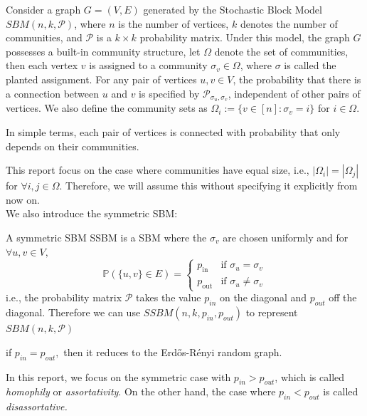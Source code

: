 \begin{definition}
Consider a graph $G=(V, E)$ generated by the Stochastic Block Model $SBM(n, k, \mathcal{P})$, where $n$ is the number of vertices, $k$ denotes the number of communities, and $\mathcal{P}$ is a $k\times k$ probability matrix. Under this model, the graph $G$ possesses a built-in community structure, let $\Omega$ denote the set of communities, then each vertex $v$ is assigned to a community $\sigma_v\in\Omega$, where $\sigma$ is called the planted assignment. For any pair of vertices $u, v \in V$, the probability that there is a connection between $u$ and $v$ is specified by $\mathcal{P}_{\sigma_u, \sigma_v}$, independent of other pairs of vertices. We also define the community sets as $\Omega_i:=\{v\in[n]: \sigma_v=i\}$ for $i\in\Omega$.
\end{definition}
\begin{remark}
    In simple terms, each pair of vertices is connected with probability that only depends on their communities. 
\end{remark}
This report focus on the case where communities have equal size, i.e., $|\Omega_i|=|\Omega_j|$ for $\forall i, j\in\Omega.$ Therefore, we will assume this without specifying it explicitly from now on.\\

We also introduce the symmetric SBM:
\vspace{-2mm}
\begin{definition}
A symmetric SBM SSBM is a SBM where the $\sigma_v$ are chosen uniformly and for $\forall u, v\in V,$ \begin{equation}
\mathbb{P}\left(\{u,v\}\in E\right) = 
    \begin{cases} 
    p_{\text{in}} & \text{if } \sigma_u = \sigma_v \\
    p_{\text{out}} & \text{if } \sigma_u \neq \sigma_v 
    \end{cases}
\end{equation}
i.e., the probability matrix $\mathcal{P}$ takes the value $p_{in}$ on the diagonal and $p_{out}$ off the diagonal. Therefore we can use $SSBM(n, k, p_{in}, p_{out})$ to represent $SBM(n, k, \mathcal{P})$
\end{definition}
\begin{remark}
    if $p_{in}=p_{out},$ then it reduces to the Erd\H{o}s-R\'{e}nyi random graph.
\end{remark}
In this report, we focus on the symmetric case with $p_{in}>p_{out}$, which is called \textit{homophily} or \textit{assortativity}. On the other hand, the case where $p_{in}<p_{out}$ is called \textit{disassortative.}\\


